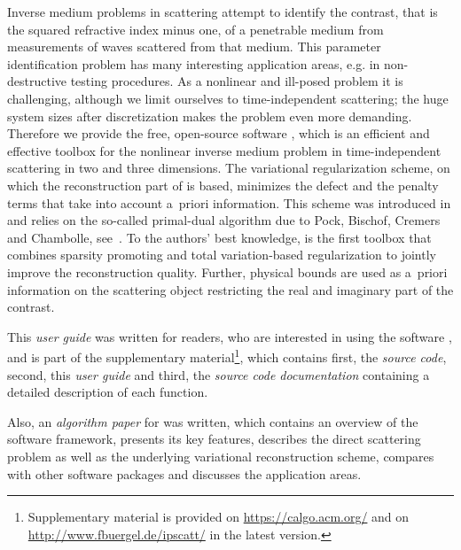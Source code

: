 \documentclass[a4paper]{article}
\begin{document}
Inverse medium problems in scattering attempt to identify the contrast, that is the squared refractive index minus one, of a penetrable medium from measurements of waves scattered from that medium. This parameter identification problem has many interesting application areas, e.g. in non-destructive testing procedures. As a nonlinear and ill-posed problem it is challenging, although we limit ourselves to time-independent scattering; the huge system sizes after discretization makes the problem even more demanding.
%
Therefore we provide the free, open-source software \IPscatt, which is an efficient and effective \MATLAB toolbox for the nonlinear inverse medium problem in time-independent scattering in two and three dimensions.
%
The variational regularization scheme, on which the reconstruction part of \IPscatt is based, minimizes the defect and the penalty terms that take into account a~priori information. This scheme was introduced in \cite[Sec.~4]{Buergel2017} and relies on the so-called primal-dual algorithm due to Pock, Bischof, Cremers and Chambolle, see~\cite{Pock2009, Chambolle2011}. To the authors' best knowledge, \IPscatt is the first toolbox that combines sparsity promoting and total variation-based regularization to jointly improve the reconstruction quality. Further, physical bounds are used as a~priori information on the scattering object restricting the real and imaginary part of the contrast.

This \emph{user guide} was written for readers, who are interested in using the software \IPscatt, and is part of the supplementary material\footnote{Supplementary material is provided on \url{https://calgo.acm.org/} and on \url{http://www.fbuergel.de/ipscatt/} in the latest version.}, which contains first, the \emph{source code}, second, this \emph{user guide} and third, the \emph{source code documentation} containing a detailed description of each function.

Also, an \emph{algorithm paper} for \IPscatt was written, which contains an overview of the software framework, presents its key features, describes the direct scattering problem as well as the underlying variational reconstruction scheme, compares \IPscatt with other software packages and discusses the application areas.
\end{document}

